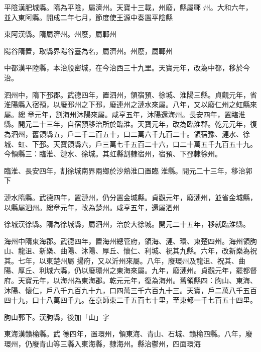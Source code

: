 \begin{pinyinscope}
 平陰漢肥城縣。隋為平陰，屬濟州。天寶十三載，州廢，縣屬鄆
 州。大和六年，並入東阿縣。開成二年七月，節度使王源中奏置平陰縣



 東阿漢縣。隋屬濟州。州廢，屬鄆州



 陽谷隋置，取縣界陽谷臺為名，屬濟州。州廢，屬鄆州



 中都漢平陸縣，本治殷密城，在今治西三十九里。天寶元年，改為中都，移於今治。



 泗州中，隋下邳郡。武德四年，置泗州，領宿預、徐城、淮陽三縣。貞觀元年，省淮陽縣入宿預，以廢邳州之下邳，廢連州之漣水來屬。八年，又以廢仁州之虹縣來屬。總
 章元年，割海州沐陽來屬。咸亨五年，沐陽還海州。長安四年，置臨淮縣。開元二十三年，自宿預移治所於臨淮。天寶元年，改為臨淮郡。乾元元年，復為泗州，舊領縣五，戶二千二百五十，口二萬六千九百二十。領宿豫、漣水、徐城、虹、下邳。天寶領縣六，戶三萬七千五百二十六，口二十萬五千九百五十九。今領縣三：臨淮、漣水、徐城。其虹縣割隸宿州，宿預、下邳隸徐州。



 臨淮、長安四年，割徐城南界兩鄉於沙熟淮口置臨
 淮縣。開元二十三年，移治郭下



 漣水隋縣。武德四年，置漣州，仍分置金城縣。貞觀元年，廢漣州，並省金城縣，以縣屬泗州。總章元年，改為楚州。咸亨五年，還屬泗州



 徐城漢徐縣。隋為徐城縣，屬泗州，治於大徐城。開元二十五年，移就臨淮縣。



 海州中隋東海郡。武德四年，置海州總管府，領海、漣、環、東楚四州。海州領朐山、龍沮、新樂、曲陽、沐陽、厚丘、懷仁、利城、祝其九縣。六年，改新樂為祝其。七年，以東楚州屬
 揚府，又以沂州來屬。八年，廢環州及龍沮、祝其、曲陽、厚丘、利城六縣，仍以廢環州之東海來屬。九年，廢漣州。貞觀元年，罷都督府。天寶元年，以海州為東海郡。乾元元年，復為海州。舊領縣四：朐山、東海、沐陽、懷仁，戶八千九百九十九，口四萬三千六百九十三。天寶，戶二萬八千五百四十九，口十八萬四千九。在京師東二千五百七十里，至東都一千七百五十四里。



 朐山郭下。漢朐縣，後加「山」字



 東海漢贛榆縣。武
 德四年，置環州，領東海、青山、石城、贛榆四縣。八年，廢環州，仍廢青山等三縣入東海縣，隸海州。縣治鬱州，四面環海




\end{pinyinscope}

